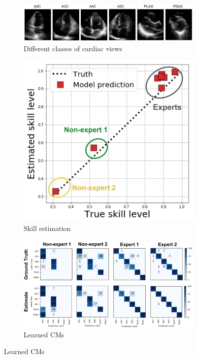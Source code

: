 \begin{figure}[h]
	\center
	\begin{subfigure}[]{\linewidth}
		\caption{Different classes of cardiac views}
		\vspace{-3mm}	
		\includegraphics[width=\linewidth]{chapter_4/figures/figure_cardiac_views_02.png}
	\end{subfigure}
	\hspace{30mm}
	\hfill
	\begin{subfigure}[]{0.45\linewidth}
		\vspace{3mm}
		\caption{Skill estimation}
		\vspace{-3mm}		
		\includegraphics[width=0.9\linewidth]{chapter_4/figures/figure_real_us_annotator_clustering_03.png}
	\end{subfigure}
	\hspace{0mm}
	\begin{subfigure}[]{0.75\linewidth}
		\vspace{3mm}
		\caption{Learned CMs}
		\vspace{-3mm}
		\includegraphics[width=\linewidth]{chapter_4/figures/figure_real_us_cms_visualization_02.png}
	\end{subfigure}
	

\end{figure}
